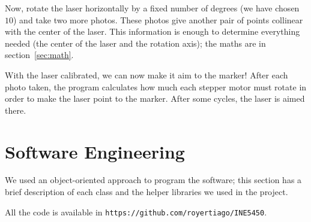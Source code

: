 \documentclass{article}
\begin{document}
Now, rotate the laser horizontally by a fixed number of degrees
(we have chosen $10$)
and take two more photos.
These photos give another pair of points collinear with the center of the laser.
This information is enough to determine everything needed
(the center of the laser and the rotation axis);
the maths are in section~\ref{sec:math}.

With the laser calibrated,
we can now make it aim to the marker!
After each photo taken,
the program calculates how much each stepper motor must rotate
in order to make the laser point to the marker.
After some cycles,
the laser is aimed there.

\section{Software Engineering}

We used an object-oriented approach to program the software;
this section has a brief description of each class
and the helper libraries we used in the project.

All the code is available in \verb"https://github.com/royertiago/INE5450".
\end{document}
